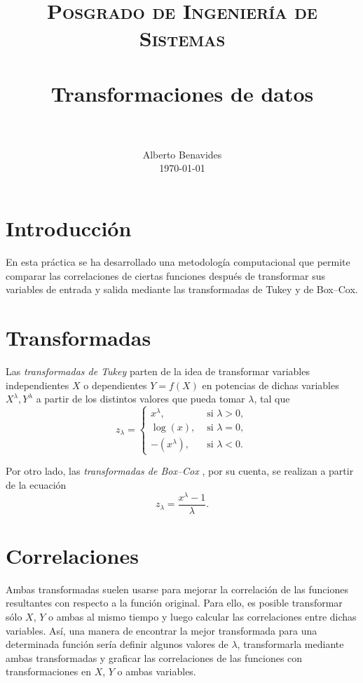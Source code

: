 \documentclass[paper=leter, fontsize=11pt]{scrartcl}
\title{
		\usefont{OT1}{bch}{b}{n}
		\normalfont \normalsize \textsc{Posgrado de Ingeniería de Sistemas} \\ [25pt]
		\horrule{0.5pt} \\[0.4cm]
		\huge Transformaciones de datos \\
		\horrule{2pt} \\[0.5cm]
}
\author{
		\normalfont 								\normalsize
        Alberto Benavides\\[-3pt]		\normalsize
        \today
}
\date{}
\numberwithin{equation}{section}		%
\numberwithin{figure}{section}			%
\numberwithin{table}{section}				%
\begin{document}
\maketitle

\section{Introducción}
En esta práctica se ha desarrollado una metodología computacional que permite comparar las correlaciones de ciertas funciones después de transformar sus variables de entrada y salida mediante las transformadas de Tukey y de Box--Cox.

\section{Transformadas}

Las \emph{transformadas de Tukey} \citep*{tukey} parten de la idea de transformar variables independientes $X$ o dependientes $Y = f(X)$ en potencias de dichas variables $X^\lambda, Y^\lambda$ a partir de los distintos valores que pueda tomar $\lambda$, tal que
\begin{equation}
    z_\lambda = \left \{
        \begin{array}{ll}
        x^\lambda, & \text{ si } \lambda > 0, \\
                    \log (x), & \text{ si } \lambda = 0, \\
                    -(x^\lambda), & \text{ si } \lambda < 0.
        \end{array}
        \right .
\end{equation}

Por otro lado, las \emph{transformadas de Box--Cox} \citep*{boxcox}, por su cuenta, se realizan a partir de la ecuación
\begin{equation}
    z_\lambda = \frac{x^\lambda - 1}{\lambda}.
\end{equation}

\section{Correlaciones}

Ambas transformadas suelen usarse para mejorar la correlación de las funciones resultantes con respecto a la función original. Para ello, es posible transformar sólo $X$, $Y$ o ambas al mismo tiempo y luego calcular las correlaciones entre dichas variables. Así, una manera de encontrar la mejor transformada para una determinada función sería definir algunos valores de $\lambda$, transformarla mediante ambas transformadas y graficar las correlaciones de las funciones con transformaciones en $X$, $Y$ o ambas variables.
\end{document}
